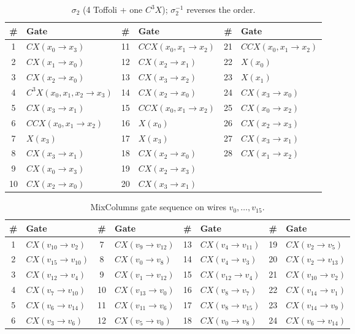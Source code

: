 \documentclass[runningheads,10pt]{llncs}
\begin{document}
\begin{table}[htbp]
\centering
\caption{$\sigma_2$ (4 Toffoli + one $C^3X$); $\sigma_2^{-1}$ reverses the order.}
\label{tab:sigma2-full-gates}
\small
\begin{tabular}{cl cl cl}
\toprule
\# & Gate & \# & Gate & \# & Gate \\
\midrule
1 & $CX(x_0\to x_3)$ & 11 & $CCX(x_0,x_1\to x_2)$ & 21 & $CCX(x_0,x_1\to x_2)$ \\
2 & $CX(x_1\to x_0)$ & 12 & $CX(x_2\to x_1)$ & 22 & $X(x_0)$ \\
3 & $CX(x_2\to x_0)$ & 13 & $CX(x_3\to x_2)$ & 23 & $X(x_1)$ \\
4 & $C^3X(x_0,x_1,x_2\to x_3)$ & 14 & $CX(x_2\to x_0)$ & 24 & $CX(x_3\to x_0)$ \\
5 & $CX(x_3\to x_1)$ & 15 & $CCX(x_0,x_1\to x_2)$ & 25 & $CX(x_0\to x_2)$ \\
6 & $CCX(x_0,x_1\to x_2)$ & 16 & $X(x_0)$ & 26 & $CX(x_2\to x_3)$ \\
7 & $X(x_3)$ & 17 & $X(x_3)$ & 27 & $CX(x_3\to x_1)$ \\
8 & $CX(x_3\to x_1)$ & 18 & $CX(x_2\to x_0)$ & 28 & $CX(x_1\to x_2)$ \\
9 & $CX(x_0\to x_3)$ & 19 & $CX(x_2\to x_3)$ & & \\
10 & $CX(x_2\to x_0)$ & 20 & $CX(x_3\to x_1)$ & & \\
\bottomrule
\end{tabular}
\end{table}

\begin{table}[htbp]
\centering
\caption{MixColumns gate sequence on wires $v_0,\ldots,v_{15}$.}
\label{tab:mixcolumns-gates}
\small
\begin{tabular}{cl cl cl cl}
\toprule
\# & Gate & \# & Gate & \# & Gate & \# & Gate \\
\midrule
1 & $CX(v_{10}\to v_2)$ & 7 & $CX(v_9\to v_{12})$ & 13 & $CX(v_4\to v_{11})$ & 19 & $CX(v_2\to v_5)$ \\
2 & $CX(v_{15}\to v_{10})$ & 8 & $CX(v_0\to v_8)$ & 14 & $CX(v_4\to v_3)$ & 20 & $CX(v_2\to v_{13})$ \\
3 & $CX(v_{12}\to v_4)$ & 9 & $CX(v_1\to v_{12})$ & 15 & $CX(v_{12}\to v_4)$ & 21 & $CX(v_{10}\to v_2)$ \\
4 & $CX(v_7\to v_{10})$ & 10 & $CX(v_{13}\to v_0)$ & 16 & $CX(v_8\to v_7)$ & 22 & $CX(v_{14}\to v_1)$ \\
5 & $CX(v_6\to v_{14})$ & 11 & $CX(v_{11}\to v_6)$ & 17 & $CX(v_8\to v_{15})$ & 23 & $CX(v_{14}\to v_9)$ \\
6 & $CX(v_3\to v_6)$ & 12 & $CX(v_5\to v_0)$ & 18 & $CX(v_0\to v_8)$ & 24 & $CX(v_6\to v_{14})$ \\
\bottomrule
\end{tabular}
\end{table}
\end{document}
